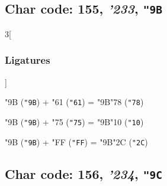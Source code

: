 \documentclass{article}
\newlength{\maxcharwidth}
\begin{document}
\subsection{Char code: 155, {\it'233}, {\tt"9B}}
\label{char_155}


\begin{multicols}{3}[\subsubsection{Ligatures}]

{\testfont\char"9B\noboundary} ({\tt"9B}) + {\testfont\char"61\noboundary} ({\tt"61}) = {\testfont\char"9B\noboundary}{\testfont\char"78\noboundary} ({\tt"78}) 

{\testfont\char"9B\noboundary} ({\tt"9B}) + {\testfont\char"75\noboundary} ({\tt"75}) = {\testfont\char"9B\noboundary}{\testfont\char"10\noboundary} ({\tt"10}) 

{\testfont\char"9B\noboundary} ({\tt"9B}) + {\testfont\char"FF\noboundary} ({\tt"FF}) = {\testfont\char"9B\noboundary}{\testfont\char"2C\noboundary} ({\tt"2C}) 

\end{multicols}

\subsection{Char code: 156, {\it'234}, {\tt"9C}}
\label{char_156}

\end{document}
